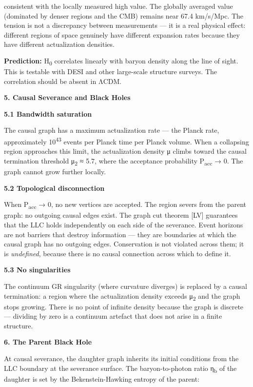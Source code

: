 \documentclass[12pt,a4paper]{article}
\begin{document}
consistent with the locally measured high value. The globally averaged
value (dominated by denser regions and the CMB) remains near 67.4
km/s/Mpc. The tension is not a discrepancy between measurements --- it
is a real physical effect: different regions of space genuinely have
different expansion rates because they have different actualization
densities.

\textbf{Prediction:} H\textsubscript{0} correlates linearly with baryon
density along the line of sight. This is testable with DESI and other
large-scale structure surveys. The correlation should be absent in ΛCDM.

\textbf{5. Causal Severance and Black Holes}

\textbf{5.1 Bandwidth saturation}

The causal graph has a maximum actualization rate --- the Planck rate,
approximately 10\textsuperscript{43} events per Planck time per Planck
volume. When a collapsing region approaches this limit, the
actualization density μ climbs toward the causal termination threshold
μ\textsubscript{2} ≈ 5.7, where the acceptance probability
P\textsubscript{acc} → 0. The graph cannot grow further locally.

\textbf{5.2 Topological disconnection}

When P\textsubscript{acc} → 0, no new vertices are accepted. The region
severs from the parent graph: no outgoing causal edges exist. The graph
cut theorem {[}LV{]} guarantees that the LLC holds independently on each
side of the severance. Event horizons are not barriers that destroy
information --- they are boundaries at which the causal graph has no
outgoing edges. Conservation is not violated across them; it is
\emph{undefined}, because there is no causal connection across which to
define it.

\textbf{5.3 No singularities}

The continuum GR singularity (where curvature diverges) is replaced by a
causal termination: a region where the actualization density exceeds
μ\textsubscript{2} and the graph stops growing. There is no point of
infinite density because the graph is discrete --- dividing by zero is a
continuum artefact that does not arise in a finite structure.

\textbf{6. The Parent Black Hole}

At causal severance, the daughter graph inherits its initial conditions
from the LLC boundary at the severance surface. The baryon-to-photon
ratio η\textsubscript{b} of the daughter is set by the
Bekenstein-Hawking entropy of the parent:
\end{document}
